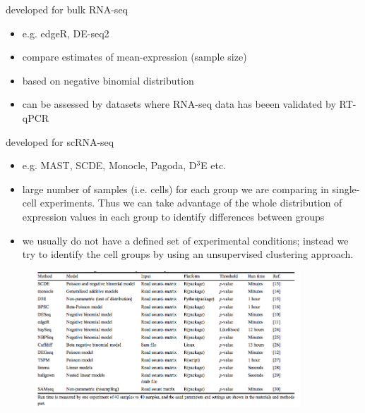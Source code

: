 \documentclass{beamer}\usepackage[]{graphicx}\usepackage[]{color}
\begin{document}
\begin{frame} %
\begin{block}{developed for bulk RNA-seq}
\begin{itemize}
\small 
  \item e.g. edgeR, DE-seq2
  \item compare estimates of mean-expression (sample size)
  \item based on negative binomial distribution
  \item can be assessed by datasets where RNA-seq data has beeen validated by RT-qPCR
\end{itemize}
\end{block}
\end{frame}

\begin{frame} %
\begin{block}{developed for scRNA-seq}
\begin{itemize}
\small
  \item e.g. MAST, SCDE, Monocle, Pagoda, D$^3$E etc. 
  \item large number of samples (i.e. cells) for each group we are comparing in single-cell experiments. Thus we can take advantage of the whole distribution of expression values in each group to identify differences between groups 
  \item we usually do not have a defined set of experimental conditions; instead we try to  identify the cell groups by using an unsupervised clustering approach.
 \end{itemize}
\end{block}
\end{frame}

\begin{frame}
\begin{center}
\begin{figure}
\includegraphics[width=10cm]{Images/MiaoTable1.png}
\caption{\cite{Miao2016}}
\end{figure}
\end{center}
\end{frame}
\end{document}
